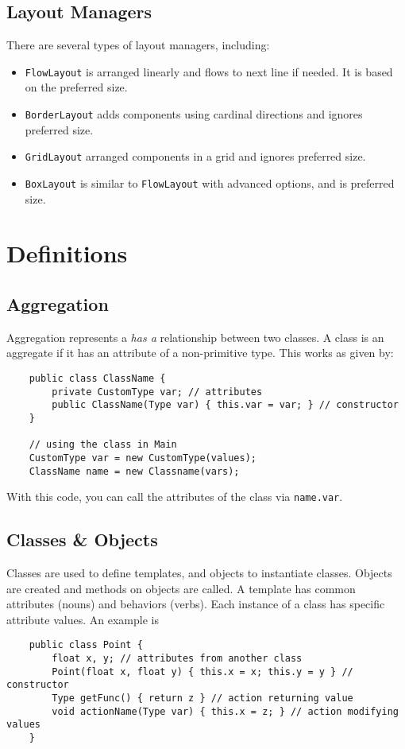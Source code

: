 \documentclass[letterpaper, openany, justified]{tufte-book}
\newcommand{\cd}[1]{\lstinline{#1}}
\begin{document}
\begin{fullwidth}
\section{Layout Managers}
There are several types of layout managers, including:
\begin{itemize}
    \item \cd{FlowLayout} is arranged linearly and flows to next line if needed. It is based on the preferred size.
    \item \cd{BorderLayout} adds components using cardinal directions and ignores preferred size.
    \item \cd{GridLayout} arranged components in a grid and ignores preferred size.
    \item \cd{BoxLayout} is similar to \cd{FlowLayout} with advanced options, and is preferred size.
\end{itemize}

\chapter{Definitions}

\section{Aggregation}
Aggregation represents a \textit{has a} relationship between two classes. A class is an aggregate if it has an attribute of a non-primitive type. This works as given by:
\begin{lstlisting}
    public class ClassName {
        private CustomType var; // attributes
        public ClassName(Type var) { this.var = var; } // constructor
    }

    // using the class in Main
    CustomType var = new CustomType(values);
    ClassName name = new Classname(vars);
\end{lstlisting}
With this code, you can call the attributes of the class via \cd{name.var}.

\section{Classes \& Objects}
Classes are used to define templates, and objects to instantiate classes. Objects are created and methods on objects are called. A template has common attributes (nouns) and behaviors (verbs). Each instance of a class has specific attribute values. An example is
\begin{lstlisting}
    public class Point {
        float x, y; // attributes from another class
        Point(float x, float y) { this.x = x; this.y = y } // constructor
        Type getFunc() { return z } // action returning value
        void actionName(Type var) { this.x = z; } // action modifying values
    }
\end{lstlisting}


\end{fullwidth}
\end{document}
